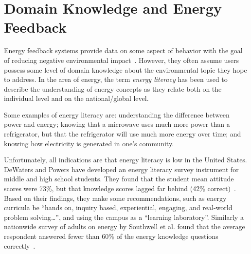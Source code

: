 \documentclass[10pt, conference, compsocconf]{IEEEtran}
\begin{document}
%
%
%


\section{Domain Knowledge and Energy Feedback}

Energy feedback systems provide data on some aspect of behavior with the goal of reducing negative environmental impact~\cite{Froehlich2010}. However, they often assume users possess some level of domain knowledge about the environmental topic they hope to address. In the area of energy, the term \emph{energy literacy} has been used to describe the understanding of energy concepts as they relate both on the individual level and on the national/global level.

Some examples of energy literacy are: understanding the difference between power and energy;	knowing that a microwave uses much more power than a refrigerator, but that the refrigerator will use much more energy over time; and knowing how electricity is generated in one's community.

Unfortunately, all indications are that energy literacy is low in the United States. DeWaters and Powers have developed an energy literacy survey instrument for middle and high school students. They found that the student mean attitude scores were 73\%, but that knowledge scores lagged far behind (42\% correct)~\cite{DeWaters2011}. Based on their findings, they make some recommendations, such as energy curricula be ``hands on, inquiry based, experiential, engaging, and real-world problem solving\ldots'', and using the campus as a ``learning laboratory''. Similarly a nationwide survey of adults on energy by Southwell et al. found that the average respondent answered fewer than 60\% of the energy knowledge questions correctly~\cite{Southwell2012}.
\end{document}
